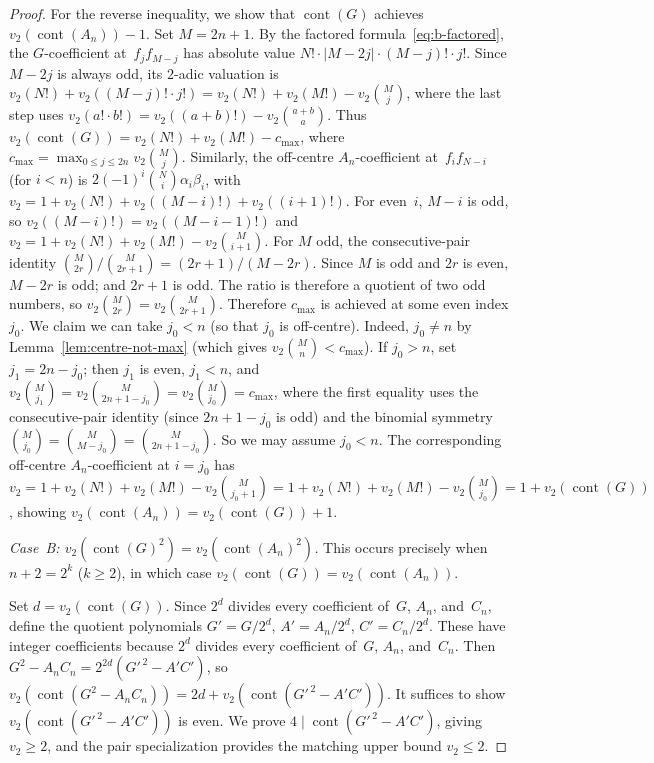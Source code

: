 \documentclass[10pt]{amsart}
\theoremstyle{definition}
\theoremstyle{remark}
\DeclareMathOperator{\cont}{cont}
\begin{document}
\begin{proof}
For the reverse inequality, we show that $\cont(G)$ achieves
$v_2(\cont(A_n))-1$.
Set $M = 2n{+}1$.  By the factored formula~\eqref{eq:b-factored},
the $G$-coefficient at~$f_jf_{M-j}$ has absolute value
$N!\cdot|M{-}2j|\cdot(M{-}j)!\cdot j!$.
Since $M{-}2j$ is always odd, its $2$-adic valuation is
$v_2(N!) + v_2((M{-}j)!\cdot j!)
= v_2(N!) + v_2(M!) - v_2\binom{M}{j}$,
where the last step uses $v_2(a!\cdot b!) = v_2((a{+}b)!) - v_2\binom{a+b}{a}$.
Thus $v_2(\cont(G)) = v_2(N!) + v_2(M!) - c_{\max}$,
where $c_{\max} = \max_{0\le j\le 2n} v_2\binom{M}{j}$.
Similarly, the off-centre $A_n$-coefficient at~$f_if_{N-i}$ (for $i<n$)
is $2(-1)^i\binom{N}{i}\alpha_i\beta_i$, with
$v_2 = 1 + v_2(N!) + v_2((M{-}i)!) + v_2((i{+}1)!)$.
For even~$i$, $M{-}i$ is odd, so $v_2((M{-}i)!) = v_2((M{-}i{-}1)!)$ and
$v_2 = 1 + v_2(N!) + v_2(M!) - v_2\binom{M}{i+1}$.
For $M$ odd, the consecutive-pair identity
$\binom{M}{2r}/\binom{M}{2r{+}1} = (2r{+}1)/(M{-}2r)$.
Since $M$ is odd and $2r$ is even, $M{-}2r$ is odd; and $2r{+}1$ is odd.
The ratio is therefore a quotient of two odd numbers, so
$v_2\binom{M}{2r} = v_2\binom{M}{2r{+}1}$.
Therefore $c_{\max}$ is achieved at some even index $j_0$.
We claim we can take $j_0 < n$ (so that $j_0$ is off-centre).
Indeed, $j_0 \ne n$ by Lemma~\ref{lem:centre-not-max}
(which gives $v_2\binom{M}{n} < c_{\max}$).
If $j_0 > n$, set $j_1 = 2n - j_0$; then $j_1$ is even,
$j_1 < n$, and
$v_2\binom{M}{j_1} = v_2\binom{M}{2n+1-j_0} = v_2\binom{M}{j_0} = c_{\max}$,
where the first equality uses the consecutive-pair identity
(since $2n{+}1{-}j_0$ is odd) and the binomial symmetry
$\binom{M}{j_0} = \binom{M}{M-j_0} = \binom{M}{2n+1-j_0}$.
So we may assume $j_0 < n$.
The corresponding off-centre $A_n$-coefficient at $i = j_0$ has
$v_2 = 1 + v_2(N!) + v_2(M!) - v_2\binom{M}{j_0+1}
= 1 + v_2(N!) + v_2(M!) - v_2\binom{M}{j_0}
= 1 + v_2(\cont(G))$, showing
$v_2(\cont(A_n)) = v_2(\cont(G))+1$.

\medskip\noindent\emph{Case~B: $v_2(\cont(G)^2)= v_2(\cont(A_n)^2)$.}
This occurs precisely when $n+2=2^k$ ($k \ge 2$), in which case
$v_2(\cont(G))=v_2(\cont(A_n))$.

Set $d = v_2(\cont(G))$.  Since $2^d$ divides every coefficient
of~$G$, $A_n$, and~$C_n$, define the quotient polynomials
$G' = G/2^d$, $A' = A_n/2^d$, $C' = C_n/2^d$.
These have integer coefficients because $2^d$ divides every coefficient
of~$G$, $A_n$, and~$C_n$.  Then
$G^2-A_nC_n = 2^{2d}(G'^{\,2}-A'C')$, so
$v_2(\cont(G^2-A_nC_n))=2d+v_2(\cont(G'^{\,2}-A'C'))$.
It suffices to show $v_2(\cont(G'^{\,2}-A'C'))$ is even.  We prove
$4 \mid \cont(G'^{\,2}-A'C')$, giving $v_2\ge 2$, and the pair
specialization provides the matching upper bound $v_2 \le 2$.


\end{proof}
\end{document}
